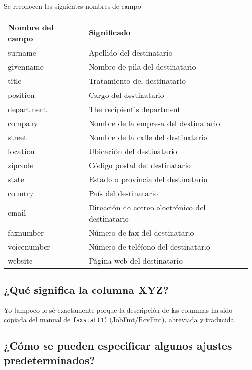 \documentclass[a4paper,10pt]{scrartcl}
\begin{document}
Se reconocen los siguientes nombres de campo:
\begin{center}
\begin{tabular}{|l|p{}|}
\hline
\bfseries Nombre del campo & \bfseries Significado \\
\hline\hline
\ttfamily surname & Apellido del destinatario\\\hline
\ttfamily givenname & Nombre de pila del destinatario \\\hline
\ttfamily title & Tratamiento del destinatario \\\hline
\ttfamily position & Cargo del destinatario \\\hline
\ttfamily department & The recipient's department\\\hline
\ttfamily company & Nombre de la empresa del destinatario\\\hline
\ttfamily street & Nombre de la calle del destinatario \\\hline
\ttfamily location & Ubicación del destinatario\\\hline
\ttfamily zipcode & Código postal del destinatario \\\hline
\ttfamily state & Estado o provincia del destinatario\\\hline
\ttfamily country & País del destinatario\\\hline
\ttfamily email & Dirección de correo electrónico del destinatario\\\hline
\ttfamily faxnumber & Número de fax del destinatario \\\hline
\ttfamily voicenumber & Número de teléfono del destinatario \\\hline
\ttfamily website & Página web del destinatario\\\hline
\end{tabular}
\end{center}

\subsection{¿Qué significa la columna XYZ?}

Yo tampoco lo sé exactamente porque la descripción de las columnas ha sido copiada del manual de \verb#faxstat(1)# (JobFmt/RcvFmt), abreviada y traducida.

\subsection{¿Cómo se pueden especificar algunos ajustes predeterminados?}
\end{document}
